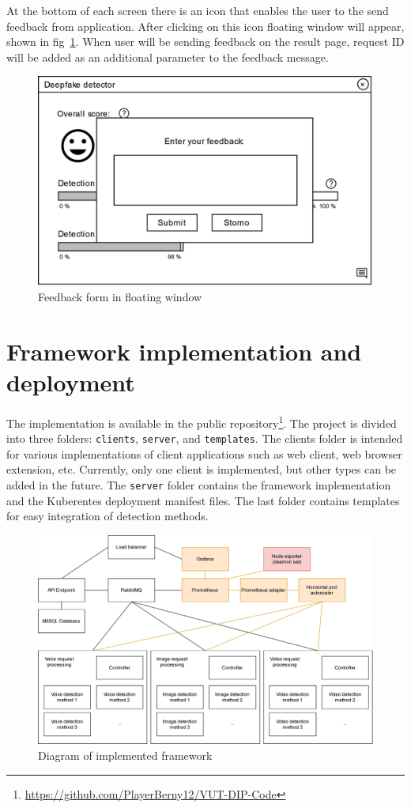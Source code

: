 At the bottom of each screen there is an icon that enables the user to the send feedback from application. After clicking on this icon floating window will appear, shown in fig~\ref{fig:client_wireframe_feedback}. When user will be sending feedback on the result page, request ID will be added as an additional parameter to the feedback message. 

\begin{figure}[H]
    \centering  
    \includegraphics[width=.498\linewidth]{other-fig/client_wireframe_feedback.png}
    \caption{Feedback form in floating window}
    \label{fig:client_wireframe_feedback}
\end{figure}

\chapter{Framework implementation and deployment}
\label{chapter:framework_implementation}

The implementation is available in the public repository\footnote{\url{https://github.com/PlayerBerny12/VUT-DIP-Code}}. The project is divided into three folders: \texttt{clients}, \texttt{server}, and \texttt{templates}. The clients folder is intended for various implementations of client applications such as web client, web browser extension, etc. Currently, only one client is implemented, but other types can be added in the future. The \texttt{server} folder contains the framework implementation and the Kuberentes deployment manifest files. The last folder contains templates for easy integration of detection methods.

\begin{figure}[H]
    \centering
    \includegraphics[width=\linewidth]{other-fig/framework_implementation.png}
    \caption{Diagram of implemented framework}
    \label{fig:framework_implementation}
\end{figure}

